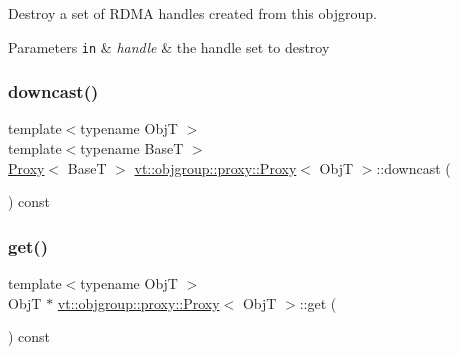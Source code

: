 Destroy a set of R\+D\+MA handles created from this objgroup. 


\begin{DoxyParams}[1]{Parameters}
\mbox{\tt in}  & {\em handle} & the handle set to destroy \\
\hline
\end{DoxyParams}
\mbox{\label{structvt_1_1objgroup_1_1proxy_1_1_proxy_ae672794dc83491200d7f6e794865a6bc}} 
\subsubsection{\texorpdfstring{downcast()}{downcast()}}
{\footnotesize\ttfamily template$<$typename ObjT $>$ \\
template$<$typename BaseT $>$ \\
\hyperlink{structvt_1_1objgroup_1_1proxy_1_1_proxy}{Proxy}$<$ BaseT $>$ \hyperlink{structvt_1_1objgroup_1_1proxy_1_1_proxy}{vt\+::objgroup\+::proxy\+::\+Proxy}$<$ ObjT $>$\+::downcast (\begin{DoxyParamCaption}{ }\end{DoxyParamCaption}) const}

\mbox{\label{structvt_1_1objgroup_1_1proxy_1_1_proxy_a62eef779c097c8398e249827e4ad7c6a}} 
\subsubsection{\texorpdfstring{get()}{get()}}
{\footnotesize\ttfamily template$<$typename ObjT $>$ \\
ObjT $\ast$ \hyperlink{structvt_1_1objgroup_1_1proxy_1_1_proxy}{vt\+::objgroup\+::proxy\+::\+Proxy}$<$ ObjT $>$\+::get (\begin{DoxyParamCaption}{ }\end{DoxyParamCaption}) const}

\mbox{\label{structvt_1_1objgroup_1_1proxy_1_1_proxy_a76cda2351cf7801abe2ebffa1403c5b8}} 
